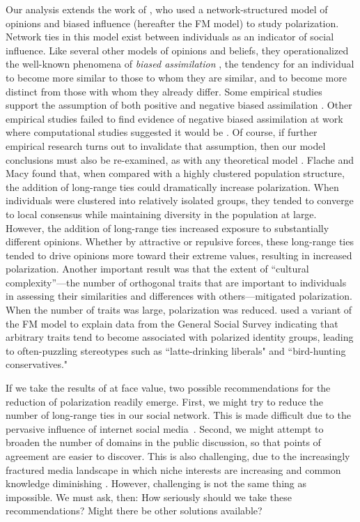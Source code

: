 Our analysis extends the work of , who used a
network-structured model of opinions and biased influence (hereafter
the FM model) to study polarization. Network ties in this model exist between individuals as an indicator of social influence. Like several other models of opinions and beliefs, they
operationalized the well-known phenomena of {\em biased assimilation} \cite{Lord1979,Dandekar2013}, the
tendency for an individual to become more similar to those to whom they are
similar, and to become more distinct from those with whom they already differ.
Some empirical studies support the assumption of both positive and negative biased assimilation
\cite[e.g.]{Adams2005, Hart2012}. Other empirical studies failed to find evidence of negative
biased assimilation at work where computational studies suggested it would be 
\cite[e.g.]{Takacs2016, Boxell2017a}. 
Of course, if further empirical research turns out to invalidate that assumption, then our model conclusions must also be re-examined, as with any theoretical model \cite{Smaldino2017}.
Flache and Macy found that, when compared with a highly clustered population structure, the addition of
long-range ties could dramatically increase polarization. 
When individuals were clustered into relatively isolated groups, they tended to converge to local consensus while maintaining diversity in the population at large. However, the addition of long-range ties increased exposure to substantially different opinions. 
Whether by attractive or repulsive forces, these long-range ties tended to
drive opinions more toward their extreme values, resulting in increased
polarization.  Another important result was that the extent of ``cultural
complexity''---the number of orthogonal traits that are important to individuals
in assessing their similarities and differences with others---mitigated
polarization. When the number of traits was large, polarization was
reduced.  used a variant of the FM model to explain data from the General Social Survey indicating that arbitrary traits tend to become associated with polarized identity groups, leading to
often-puzzling stereotypes such as ``latte-drinking liberals" and ``bird-hunting conservatives."  

If we take the results of  at face value, two possible recommendations for the reduction of polarization readily emerge.  First, we might try to reduce the
number of long-range ties in our social network. This is made difficult 
due to the pervasive
influence of internet social media~\cite{PewResearchCenter2016,PewResearchCenter2018}. 
Second, we might attempt to broaden the
number of domains in the public discussion, so that points of agreement are
easier to discover. This is also challenging, due to the increasingly fractured
media landscape in which niche interests are increasing and common knowledge
diminishing \cite{Pew2014}. 
However, challenging is not the same thing as impossible. We must ask, then: 
How seriously should we take these recommendations? Might there be
other solutions available?

